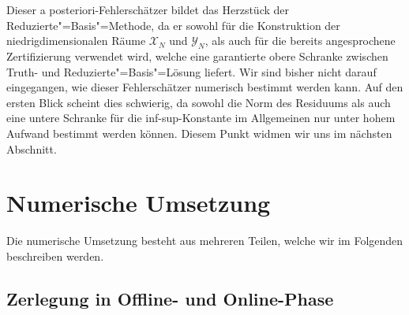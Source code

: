 \documentclass[../main.tex]{subfiles}
\begin{document}
Dieser a posteriori-Fehlerschätzer bildet das Herzstück der Reduzierte"=Basis"=Methode, da er sowohl für die Konstruktion der niedrigdimensionalen Räume $\mathcal X_{N}$ und $\mathcal Y_{N}$, als auch für die bereits angesprochene Zertifizierung verwendet wird, welche eine garantierte obere Schranke zwischen Truth- und Reduzierte"=Basis"=Lösung liefert.
Wir sind bisher nicht darauf eingegangen, wie dieser Fehlerschätzer numerisch bestimmt werden kann.
Auf den ersten Blick scheint dies schwierig, da sowohl die Norm des Residuums als auch eine untere Schranke für die inf-sup-Konstante im Allgemeinen nur unter hohem Aufwand bestimmt werden können.
Diesem Punkt widmen wir uns im nächsten Abschnitt.







\section{Numerische Umsetzung} %
\label{sub:grb:rb:numerische_umsetzung}

Die numerische Umsetzung besteht aus mehreren Teilen, welche wir im Folgenden beschreiben werden.

\subsection{Zerlegung in Offline- und Online-Phase} %
\label{sub:zerlegung_in_offline_und_online_phase}
\end{document}
